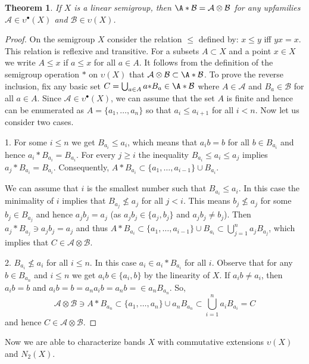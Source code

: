 \documentclass{amsart}
\newtheorem{theorem}[lem]{Theorem}
\theoremstyle{definition}
\begin{document}
\begin{theorem}\label{t2.1} If $X$ is a linear semigroup, then $\A*\mathcal B={\mathcal A}\otimes\mathcal B$ for any upfamilies ${\mathcal A}\in{\upsilon^\bullet}(X)$ and $\mathcal B\in\upsilon(X)$.
\end{theorem}

\begin{proof} On the semigroup $X$ consider the relation $\le$ defined by:  $x\le y$ iff $yx=x$. This relation is reflexive and transitive. For a subsets $A\subset X$ and a point $x\in X$ we write $A\le x$ if $a\le x$ for all $a\in A$. It follows from the definition of the semigroup operation $*$ on ${\upsilon}(X)$ that ${\mathcal A}\otimes\mathcal B\subset\A*\mathcal B$. To prove the reverse inclusion, fix any basic set $C=\bigcup_{a\in A}a{*}B_a\in\A*\mathcal B$ where $A\in{\mathcal A}$ and $B_a\in\mathcal B$ for all $a\in A$. Since ${\mathcal A}\in{\upsilon^\bullet}(X)$, we can assume that the set $A$ is finite and hence can be enumerated as $A=\{a_1,\dots,a_n\}$ so that $a_i\le a_{i+1}$ for all $i<n$.
Now let us consider two cases.

1. For some $i\le n$ we get $B_{a_i}\le a_i$, which means that $a_ib=b$ for all $b\in B_{a_i}$ and hence $a_i*B_{a_i}=B_{a_i}$. For every $j\ge i$ the inequality $B_{a_i}\le a_i\le a_j$ implies $a_j*B_{a_i}=B_{a_i}$. Consequently, $A*B_{a_i}\subset\{a_1,\dots,a_{i-1}\}\cup B_{a_i}$.

We can assume that $i$ is the smallest number such that $B_{a_i}\le a_i$. 
In this case the minimality of $i$ implies that $B_{a_j}\not\le a_j$ for all $j<i$. This means $b_j\not\le a_j$ for some $b_j\in B_{a_j}$ and hence $a_jb_j=a_j$ (as $a_jb_j\in\{a_j,b_j\}$ and $a_jb_j\ne b_j$). Then $a_j{*}B_{a_j}\ni a_jb_j=a_j$ and thus $A*B_{a_i}\subset\{a_1,\dots,a_{i-1}\}\cup B_{a_i}\subset\bigcup_{j=1}^na_jB_{a_j}$, which implies that $C\in{\mathcal A}\otimes\mathcal B$.

2. $B_{a_i}\not\le a_i$ for all $i\le n$. In this case $a_i\in a_i*B_{a_i}$ for all $i$.
Observe that for any $b\in B_{a_n}$ and $i\le n$ we get $a_ib\in\{a_i,b\}$ by the linearity of $X$.
If $a_ib\ne a_i$, then $a_ib=b$ and $a_ib=b=a_na_ib=a_nb=\in a_nB_{a_n}$. So,
$${\mathcal A}\otimes \mathcal B\ni A*B_{a_n}\subset \{a_1,\dots,a_n\}\cup a_nB_{a_n}\subset \bigcup_{i=1}^na_iB_{a_i}=C$$ and hence  $C\in{\mathcal A}\otimes\mathcal B$.
\end{proof}

Now we are able to characterize bands $X$ with commutative extensions ${\upsilon}(X)$ and $N_2(X)$.
\end{document}

